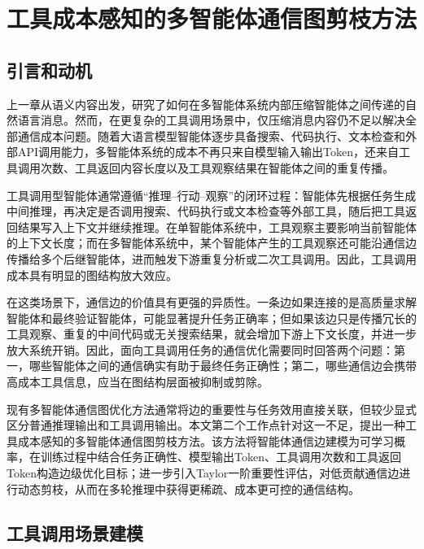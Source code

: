 
\chapter{工具成本感知的多智能体通信图剪枝方法}
\label{chap:tool-aware-pruning}

\section{引言和动机}

上一章从语义内容出发，研究了如何在多智能体系统内部压缩智能体之间传递的自然语言消息。然而，在更复杂的工具调用场景中，仅压缩消息内容仍不足以解决全部通信成本问题。随着大语言模型智能体逐步具备搜索、代码执行、文本检查和外部API调用能力\cite{ref17,ref18}，多智能体系统的成本不再只来自模型输入输出Token，还来自工具调用次数、工具返回内容长度以及工具观察结果在智能体之间的重复传播。

工具调用型智能体通常遵循``推理--行动--观察''的闭环过程\cite{ref23}：智能体先根据任务生成中间推理，再决定是否调用搜索、代码执行或文本检查等外部工具，随后把工具返回结果写入上下文并继续推理。在单智能体系统中，工具观察主要影响当前智能体的上下文长度；而在多智能体系统中，某个智能体产生的工具观察还可能沿通信边传播给多个后继智能体，进而触发下游重复分析或二次工具调用。因此，工具调用成本具有明显的图结构放大效应。

在这类场景下，通信边的价值具有更强的异质性。一条边如果连接的是高质量求解智能体和最终验证智能体，可能显著提升任务正确率；但如果该边只是传播冗长的工具观察、重复的中间代码或无关搜索结果，就会增加下游上下文长度，并进一步放大系统开销。因此，面向工具调用任务的通信优化需要同时回答两个问题：第一，哪些智能体之间的通信确实有助于最终任务正确性；第二，哪些通信边会携带高成本工具信息，应当在图结构层面被抑制或剪除。

现有多智能体通信图优化方法通常将边的重要性与任务效用直接关联\cite{ref43,ref48}，但较少显式区分普通推理输出和工具调用输出。本文第二个工作点针对这一不足，提出一种工具成本感知的多智能体通信图剪枝方法。该方法将智能体通信边建模为可学习概率，在训练过程中结合任务正确性、模型输出Token、工具调用次数和工具返回Token构造边级优化目标；进一步引入Taylor一阶重要性评估\cite{ref74}，对低贡献通信边进行动态剪枝，从而在多轮推理中获得更稀疏、成本更可控的通信结构。

\section{工具调用场景建模}

